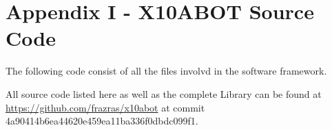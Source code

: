 \chapter*{Appendix I - X10ABOT Source Code}
\label{AppendixI}

The following code consist of all the files involvd in the \xten software framework.

\footnotesize
{}

All source code listed here as well as the complete \xten Library can be found at \url{https://github.com/frazras/x10abot} at commit 4a90414b6ea44620e459ea11ba336f0dbdc099f1.
    

